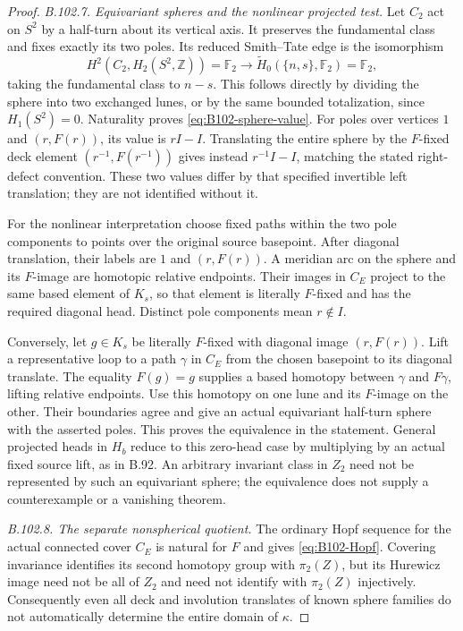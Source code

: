 \begin{proof}
\emph{B.102.7. Equivariant spheres and the nonlinear projected test.}
Let $C_2$ act on $S^2$ by a half-turn about its vertical axis.
It preserves the fundamental class and fixes exactly its two
poles. Its reduced Smith--Tate edge is the isomorphism
\[
 H^2(C_2,H_2(S^2,\mathbb Z))=\mathbb F_2
       \longrightarrow\widetilde H_0(\{n,s\},\mathbb F_2)
       =\mathbb F_2,
\]
taking the fundamental class to $n-s$. This follows directly by
dividing the sphere into two exchanged lunes, or by the same
bounded totalization, since $H_1(S^2)=0$. Naturality proves
\eqref{eq:B102-sphere-value}. For poles over vertices $1$ and
$(r,F(r))$, its value is $rI-I$. Translating the entire sphere by
the $F$-fixed deck element $(r^{-1},F(r^{-1}))$ gives instead
$r^{-1}I-I$, matching the stated right-defect convention. These
two values differ by that specified invertible left translation;
they are not identified without it.

For the nonlinear interpretation choose fixed paths within the
two pole components to points over the original source basepoint.
After diagonal translation, their labels are $1$ and $(r,F(r))$.
A meridian arc on the sphere and its $F$-image are homotopic
relative endpoints. Their images in $C_E$ project to the same
based element of $K_s$, so that element is literally $F$-fixed
and has the required diagonal head. Distinct pole components
mean $r\notin I$.

Conversely, let $g\in K_s$ be literally $F$-fixed with diagonal
image $(r,F(r))$. Lift a representative loop to a path $\gamma$
in $C_E$ from the chosen basepoint to its diagonal translate.
The equality $F(g)=g$ supplies a based homotopy between
$\gamma$ and $F\gamma$, lifting relative endpoints. Use this
homotopy on one lune and its $F$-image on the other. Their
boundaries agree and give an actual equivariant half-turn sphere
with the asserted poles. This proves the equivalence in the
statement. General projected heads in $H_b$ reduce to this
zero-head case by multiplying by an actual fixed source lift,
as in B.92. An arbitrary invariant class in $Z_2$ need not be
represented by such an equivariant sphere; the equivalence
does not supply a counterexample or a vanishing theorem.

\emph{B.102.8. The separate nonspherical quotient.}
The ordinary Hopf sequence for the actual connected cover $C_E$
is natural for $F$ and gives \eqref{eq:B102-Hopf}. Covering
invariance identifies its second homotopy group with $\pi_2(Z)$,
but its Hurewicz image need not be all of $Z_2$ and need not
identify with $\pi_2(Z)$ injectively. Consequently even all deck
and involution translates of known sphere families do not
automatically determine the entire domain of $\kappa$.


\end{proof}
